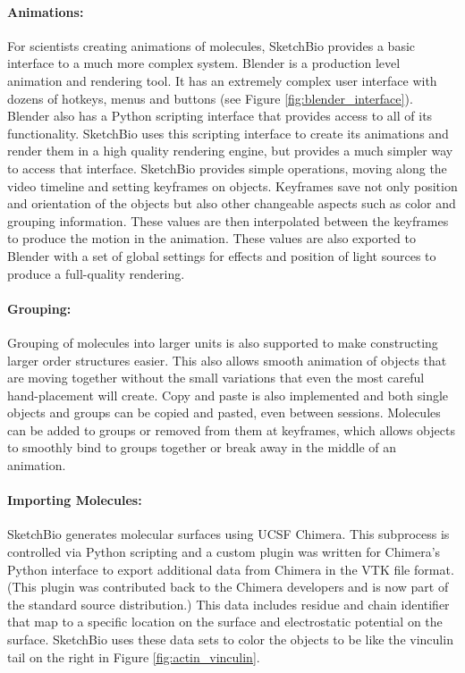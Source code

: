 \documentclass[twocolumn]{bmcart}%
\begin{document}
\paragraph*{Animations:}
For scientists creating animations of molecules, SketchBio provides a basic interface to a much more complex system.  Blender is a production level animation and rendering tool.  It has an extremely complex user interface with dozens of hotkeys, menus and buttons (see Figure \ref{fig:blender_interface}).  Blender also has a Python scripting interface that provides access to all of its functionality.  SketchBio uses this scripting interface to create its animations and render them in a high quality rendering engine, but provides a much simpler way to access that interface.  SketchBio provides simple operations, moving along the video timeline and setting keyframes on objects.  Keyframes save not only position and orientation of the objects but also other changeable aspects such as color and grouping information.  These values are then interpolated between the keyframes to produce the motion in the animation.  These values are also exported to Blender with a set of global settings for effects and position of light sources to produce a full-quality rendering.

\paragraph*{Grouping:}
Grouping of molecules into larger units is also supported to make constructing larger order structures easier.  This also allows smooth animation of objects that are moving together without the small variations that even the most careful hand-placement will create.  Copy and paste is also implemented and both single objects and groups can be copied and pasted, even between sessions. Molecules can be added to groups or removed from them at keyframes, which allows objects to smoothly bind to groups together or break away in the middle of an animation.

\paragraph*{Importing Molecules:}
SketchBio generates molecular surfaces using UCSF Chimera.  This subprocess is controlled via Python scripting and a custom plugin was written for Chimera's Python interface to export additional data from Chimera in the VTK file format.  (This plugin was contributed back to the Chimera developers and is now part of the standard source distribution.)  This data includes residue and chain identifier that map to a specific location on the surface and electrostatic potential on the surface.  SketchBio uses these data sets to color the objects to be like the vinculin tail on the right in Figure \ref{fig:actin_vinculin}.
\end{document}
